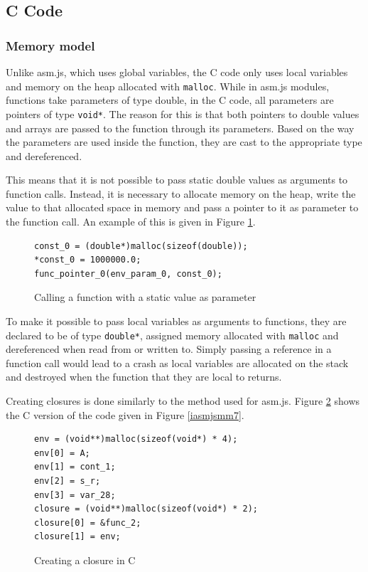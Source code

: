 \documentclass[11pt]{report}
\begin{document}
\subsection{C Code}
\subsubsection{Memory model}
Unlike asm.js, which uses global variables, the C code only uses local variables and memory on the heap allocated with \texttt{malloc}. While in asm.js modules, functions take parameters of type double, in the C code, all parameters are pointers of type \texttt{void*}. The reason for this is that both pointers to double values and arrays are passed to the function through its parameters. Based on the way the parameters are used inside the function, they are cast to the appropriate type and dereferenced.

This means that it is not possible to pass static double values as arguments to function calls. Instead, it is necessary to allocate memory on the heap, write the value to that allocated space in memory and pass a pointer to it as parameter to the function call. An example of this is given in Figure \ref{icmm1}.

\begin{figure}[ht]
\begin{lstlisting}
const_0 = (double*)malloc(sizeof(double));
*const_0 = 1000000.0;
func_pointer_0(env_param_0, const_0);
\end{lstlisting}
\caption{Calling a function with a static value as parameter}
\label{icmm1}
\end{figure}

To make it possible to pass local variables as arguments to functions, they are declared to be of type \texttt{double*}, assigned memory allocated with \texttt{malloc} and dereferenced when read from or written to. Simply passing a reference in a function call would lead to a crash as local variables are allocated on the stack and destroyed when the function that they are local to returns.

Creating closures is done similarly to the method used for asm.js. Figure \ref{icmm2} shows the C version of the code given in Figure \ref{iasmjsmm7}.

\begin{figure}[ht]
\begin{lstlisting}
env = (void**)malloc(sizeof(void*) * 4);
env[0] = A;
env[1] = cont_1;
env[2] = s_r;
env[3] = var_28;
closure = (void**)malloc(sizeof(void*) * 2);
closure[0] = &func_2;
closure[1] = env;
\end{lstlisting}
\caption{Creating a closure in C}
\label{icmm2}
\end{figure}
\end{document}
